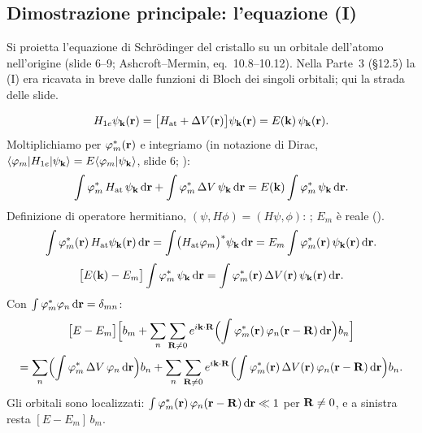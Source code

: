 \documentclass[11pt,a4paper]{article}
\begin{document}
\subsection{Dimostrazione principale: l'equazione (I)}\label{sec:dimI}
Si proietta l'equazione di Schrödinger del cristallo su un orbitale dell'atomo nell'origine (slide 6--9; Ashcroft--Mermin, eq.~10.8--10.12). Nella
Parte~3 (§12.5) la (I) era ricavata in breve dalle funzioni di Bloch dei singoli orbitali; qui la strada delle slide.
\begin{dimostrazione}
\[
H_{1e}\psi_{\mathbf k}(\mathbf r)=\bigl[H_{\mathrm{at}}+\Delta V(\mathbf r)\bigr]\psi_{\mathbf k}(\mathbf r)=E(\mathbf k)\,\psi_{\mathbf k}(\mathbf r).
\]
Moltiplichiamo per $\varphi_m^*(\mathbf r)$ e integriamo (in notazione di Dirac, $\langle\varphi_m|H_{1e}|\psi_{\mathbf k}\rangle=E\langle\varphi_m|\psi_{\mathbf k}\rangle$, slide 6;
):
\[
\int\varphi_m^*\,H_{\mathrm{at}}\,\psi_{\mathbf k}\,\mathrm d\mathbf r+\int\varphi_m^*\,\Delta V\,\psi_{\mathbf k}\,\mathrm d\mathbf r=E(\mathbf k)\int\varphi_m^*\,\psi_{\mathbf k}\,\mathrm d\mathbf r .
\]
Definizione di operatore hermitiano, $(\psi,H\phi)=(H\psi,\phi)$: ; $E_m$ è reale ().
\[
\int\varphi_m^*(\mathbf r)\,H_{\mathrm{at}}\psi_{\mathbf k}(\mathbf r)\,\mathrm d\mathbf r=\int\bigl(H_{\mathrm{at}}\varphi_m\bigr)^*\psi_{\mathbf k}\,\mathrm d\mathbf r=E_m\int\varphi_m^*(\mathbf r)\,\psi_{\mathbf k}(\mathbf r)\,\mathrm d\mathbf r .
\]
\[
\bigl[E(\mathbf k)-E_m\bigr]\int\varphi_m^*\,\psi_{\mathbf k}\,\mathrm d\mathbf r=\int\varphi_m^*(\mathbf r)\,\Delta V(\mathbf r)\,\psi_{\mathbf k}(\mathbf r)\,\mathrm d\mathbf r .
\]
Con $\int\varphi_m^*\varphi_n\,\mathrm d\mathbf r=\delta_{mn}$:
\begin{multline*}
\bigl[E-E_m\bigr]\Bigl[b_m+\sum_n\sum_{\mathbf R\ne0}e^{i\mathbf k\cdot\mathbf R}\Bigl(\int\varphi_m^*(\mathbf r)\,\varphi_n(\mathbf r-\mathbf R)\,\mathrm d\mathbf r\Bigr)b_n\Bigr]\\
=\sum_n\Bigl(\int\varphi_m^*\,\Delta V\,\varphi_n\,\mathrm d\mathbf r\Bigr)b_n+\sum_n\sum_{\mathbf R\ne0}e^{i\mathbf k\cdot\mathbf R}\Bigl(\int\varphi_m^*(\mathbf r)\,\Delta V(\mathbf r)\,\varphi_n(\mathbf r-\mathbf R)\,\mathrm d\mathbf r\Bigr)b_n .
\end{multline*}
Gli orbitali sono localizzati: $\int\varphi_m^*(\mathbf r)\,\varphi_n(\mathbf r-\mathbf R)\,\mathrm d\mathbf r\ll1$ per $\mathbf R\ne0$, e a sinistra resta $[E-E_m]\,b_m$.

\end{dimostrazione}
\end{document}
